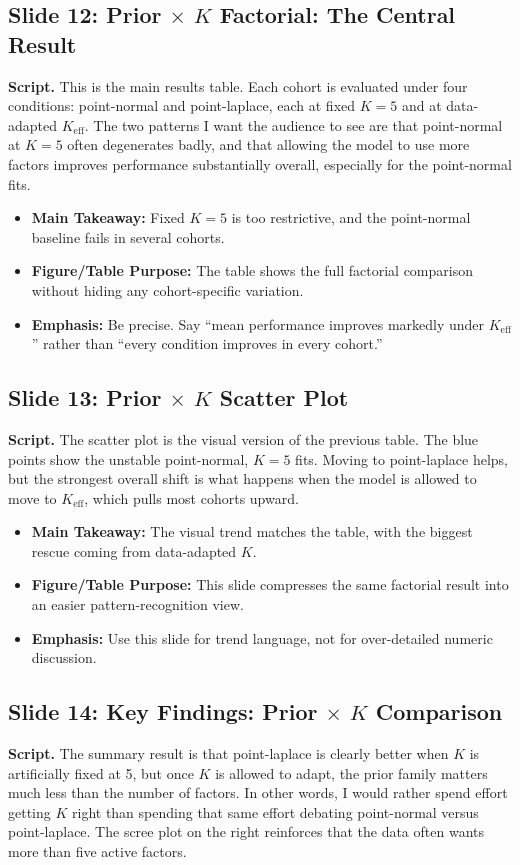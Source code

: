 \documentclass[11pt]{article}
\newcommand{\sectionlabel}[1]{\textbf{#1}}
\begin{document}
\subsection*{Slide 12: Prior $\times$ $K$ Factorial: The Central Result}
\textbf{Script.} This is the main results table. Each cohort is evaluated under four conditions: point-normal and point-laplace, each at fixed $K=5$ and at data-adapted $K_{\text{eff}}$. The two patterns I want the audience to see are that point-normal at $K=5$ often degenerates badly, and that allowing the model to use more factors improves performance substantially overall, especially for the point-normal fits.

\begin{itemize}
\item \sectionlabel{Main Takeaway:} Fixed $K=5$ is too restrictive, and the point-normal baseline fails in several cohorts.
\item \sectionlabel{Figure/Table Purpose:} The table shows the full factorial comparison without hiding any cohort-specific variation.
\item \sectionlabel{Emphasis:} Be precise. Say ``mean performance improves markedly under $K_{\text{eff}}$'' rather than ``every condition improves in every cohort.''
\end{itemize}

\subsection*{Slide 13: Prior $\times$ $K$ Scatter Plot}
\textbf{Script.} The scatter plot is the visual version of the previous table. The blue points show the unstable point-normal, $K=5$ fits. Moving to point-laplace helps, but the strongest overall shift is what happens when the model is allowed to move to $K_{\text{eff}}$, which pulls most cohorts upward.

\begin{itemize}
\item \sectionlabel{Main Takeaway:} The visual trend matches the table, with the biggest rescue coming from data-adapted $K$.
\item \sectionlabel{Figure/Table Purpose:} This slide compresses the same factorial result into an easier pattern-recognition view.
\item \sectionlabel{Emphasis:} Use this slide for trend language, not for over-detailed numeric discussion.
\end{itemize}

\subsection*{Slide 14: Key Findings: Prior $\times$ $K$ Comparison}
\textbf{Script.} The summary result is that point-laplace is clearly better when $K$ is artificially fixed at 5, but once $K$ is allowed to adapt, the prior family matters much less than the number of factors. In other words, I would rather spend effort getting $K$ right than spending that same effort debating point-normal versus point-laplace. The scree plot on the right reinforces that the data often wants more than five active factors.
\end{document}
